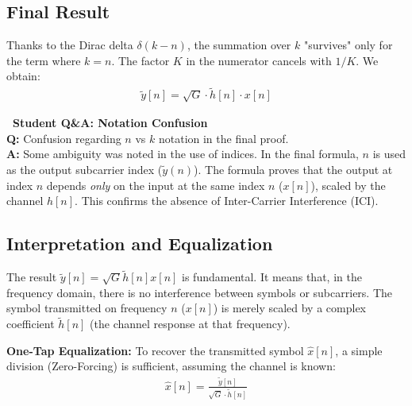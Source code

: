\documentclass[a4paper, 12pt]{book}
\begin{document}
\subsection{Final Result}
Thanks to the Dirac delta $\delta(k-n)$, the summation over $k$ "survives" only for the term where $k=n$. The factor $K$ in the numerator cancels with $1/K$. We obtain:
\begin{align}
\tilde{y}[n] = \sqrt{G} \cdot \tilde{h}[n] \cdot x[n]
\end{align}

\noindent\colorbox{yellow!25}{
    \parbox{\dimexpr\linewidth-2\fboxsep}{
        \textbf{\faQuestionCircle\ Student Q\&A: Notation Confusion} \\
        \small
        \textbf{Q:} Confusion regarding $n$ vs $k$ notation in the final proof. \\
        \textbf{A:} Some ambiguity was noted in the use of indices. In the final formula, $n$ is used as the output subcarrier index ($\tilde{y}(n)$). The formula proves that the output at index $n$ depends \textit{only} on the input at the same index $n$ ($x[n]$), scaled by the channel $h[n]$. This confirms the absence of Inter-Carrier Interference (ICI).
    }
}

\subsection{Interpretation and Equalization}
The result $\tilde{y}[n] = \sqrt{G} \tilde{h}[n] x[n]$ is fundamental. It means that, in the frequency domain, there is no interference between symbols or subcarriers. The symbol transmitted on frequency $n$ ($x[n]$) is merely scaled by a complex coefficient $\tilde{h}[n]$ (the channel response at that frequency).

\textbf{One-Tap Equalization:}
To recover the transmitted symbol $\hat{x}[n]$, a simple division (Zero-Forcing) is sufficient, assuming the channel is known:
\begin{align}
\hat{x}[n] = \frac{\tilde{y}[n]}{\sqrt{G} \cdot \tilde{h}[n]}
\end{align}
\end{document}
